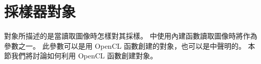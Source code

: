 \section{採樣器對象}

對象所描述的是當讀取圖像時怎樣對其採樣。
中使用內建函數讀取圖像時將作為參數之一。
此參數可以是用 OpenCL 函數創建的對象，也可以是中聲明的。
本節我們將討論如何利用 OpenCL 函數創建對象。




